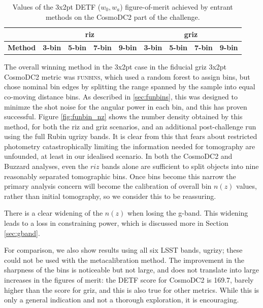 \documentclass[twocolumn,twocolappendix]{aastex63}
\begin{document}
\begin{table}[]
\begin{tabular}{|l|llll|llll|}
\hline
                & \multicolumn{4}{c|}{\textbf{riz}}      & \multicolumn{4}{c|}{\textbf{griz}}                                \\ \hline
\textbf{Method} & \textbf{3-bin} & \textbf{5-bin} & \textbf{7-bin} & \textbf{9-bin} & \textbf{3-bin} & \textbf{5-bin} & \textbf{7-bin} & \textbf{9-bin} \\ \hline

\hline
\end{tabular}
\caption{Values of the 3x2pt DETF ($w_0,w_a$) figure-of-merit achieved by entrant methods on the 
CosmoDC2 part of the challenge.}
\label{tab:cosmodc2}
\end{table}

The overall winning method in the 3x2pt case in the fiducial griz 3x2pt CosmoDC2 metric was \textsc{funbins},
which used a random forest to assign bins, but chose nominal bin edges by splitting the range spanned
by the sample into equal co-moving distance bins. As described in \autoref{sec:funbins},  this was designed
to minimze the shot noise for the angular power in each bin, and this has proven successful. 
Figure \ref{fig:funbin_nz} shows the number density obtained by this method, for both the riz and griz 
scenarios, and an additional post-challenge run using the full Rubin ugrizy bands.
It is clear from this that fears about restricted photometry catastrophically limiting
the information needed for tomography are unfounded, at least in our idealised scenario.
In both the CosmoDC2 and Buzzard analyses,
even the $riz$ bands alone are sufficient to split objects into nine reasonably separated
tomographic bins.  Once bins become this narrow the primary analysis concern will become the calibration 
of overall bin $n(z)$ values, rather than initial tomography, so we consider this to be reassuring.

There is a clear widening of the $n(z)$ when losing the g-band.  This widening leads to a loss in 
constraining power, which is discussed more in Section \ref{sec:gband}.

For comparison, we also show results using all six LSST bands, ugrizy; these could not be used
with the metacalibration method. The improvement in the sharpness of the bins is noticeable but not large,
and does not translate into large increases in the figures of merit: the DETF score for CosmoDC2
is 169.7, barely higher than the score for griz, and this is also true for other metrics.   While this is only a general indication and not a thorough exploration, it is encouraging.
\end{document}
